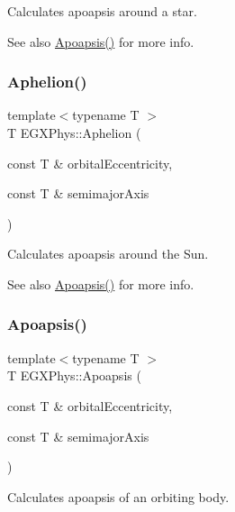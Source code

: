 Calculates apoapsis around a star. 

\begin{DoxySeeAlso}{See also}
\hyperlink{group___e_g_x_phys-_apoapsis_gaf962e650bf84a568458e8eb39b1c61ba}{Apoapsis()} for more info. 
\end{DoxySeeAlso}
\mbox{\label{group___e_g_x_phys-_apoapsis_ga77dadb4d082a441c8e85203c983722c7}} 
\subsubsection{\texorpdfstring{Aphelion()}{Aphelion()}}
{\footnotesize\ttfamily template$<$typename T $>$ \\
T E\+G\+X\+Phys\+::\+Aphelion (\begin{DoxyParamCaption}\item[{const T \&}]{orbital\+Eccentricity,  }\item[{const T \&}]{semimajor\+Axis }\end{DoxyParamCaption})}



Calculates apoapsis around the Sun. 

\begin{DoxySeeAlso}{See also}
\hyperlink{group___e_g_x_phys-_apoapsis_gaf962e650bf84a568458e8eb39b1c61ba}{Apoapsis()} for more info. 
\end{DoxySeeAlso}
\mbox{\label{group___e_g_x_phys-_apoapsis_gaf962e650bf84a568458e8eb39b1c61ba}} 
\subsubsection{\texorpdfstring{Apoapsis()}{Apoapsis()}}
{\footnotesize\ttfamily template$<$typename T $>$ \\
T E\+G\+X\+Phys\+::\+Apoapsis (\begin{DoxyParamCaption}\item[{const T \&}]{orbital\+Eccentricity,  }\item[{const T \&}]{semimajor\+Axis }\end{DoxyParamCaption})}



Calculates apoapsis of an orbiting body. 

